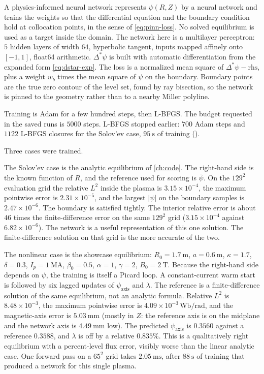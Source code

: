 \documentclass[11pt,a4paper,oneside,openany]{book}
\newcommand{\code}{\path}
\numberwithin{equation}{chapter}
\newcommand{\Dstar}{\Delta^{*}}
\newcommand{\psibar}{\bar{\psi}}
\newcommand{\Ip}{I_{p}}
\theoremstyle{definition}
\begin{document}
A physics-informed neural network represents \(\psi(R,Z)\) by a neural network and trains the weights so that the differential equation and the boundary condition hold at collocation points, in the sense of \eqref{eq:pinn-loss}. No solved equilibrium is used as a target inside the domain. The network here is a multilayer perceptron: \(5\) hidden layers of width \(64\), hyperbolic tangent, inputs mapped affinely onto \([-1,1]\), float64 arithmetic. \(\Dstar\psi\) is built with automatic differentiation from the expanded form \eqref{eq:dstar-exp}. The loss is a normalized mean square of \(\Dstar\psi-\mathrm{rhs}\), plus a weight \(w_{b}\) times the mean square of \(\psi\) on the boundary. Boundary points are the true zero contour of the level set, found by ray bisection, so the network is pinned to the geometry rather than to a nearby Miller polyline.

Training is Adam for a few hundred steps, then L-BFGS. The budget requested in the saved runs is \(5000\) steps. L-BFGS stopped earlier: \(700\) Adam steps and \(1122\) L-BFGS closures for the Solov'ev case, \(\qty{95}{\second}\) of training (\code{outputs/pinn/solovev_metrics.json}).

Three cases were trained.

The Solov'ev case is the analytic equilibrium of \cref{ch:code}. The right-hand side is the known function of \(R\), and the reference used for scoring is \(\psibar\). On the \(129^{2}\) evaluation grid the relative \(L^{2}\) inside the plasma is \(3.15\times 10^{-4}\), the maximum pointwise error is \(2.31\times 10^{-5}\), and the largest \(\lvert\psi\rvert\) on the boundary samples is \(2.47\times 10^{-6}\). The boundary is satisfied tightly. The interior relative error is about \(46\) times the finite-difference error on the same \(129^{2}\) grid (\(3.15\times 10^{-4}\) against \(6.82\times 10^{-6}\)). The network is a useful representation of this one solution. The finite-difference solution on that grid is the more accurate of the two.

The nonlinear case is the showcase equilibrium: \(R_{0}=\qty{1.7}{\metre}\), \(a=\qty{0.6}{\metre}\), \(\kappa=1.7\), \(\delta=0.3\), \(\Ip=\qty{1}{\mega\ampere}\), \(\beta_{0}=0.5\), \(\alpha=1\), \(\gamma=2\), \(B_{0}=\qty{2}{\tesla}\). Because the right-hand side depends on \(\psi\), the training is itself a Picard loop. A constant-current warm start is followed by six lagged updates of \(\psi_{\mathrm{axis}}\) and \(\lambda\). The reference is a finite-difference solution of the same equilibrium, not an analytic formula. Relative \(L^{2}\) is \(8.48\times 10^{-3}\), the maximum pointwise error is \(4.09\times 10^{-3}\,\mathrm{Wb/rad}\), and the magnetic-axis error is \(\qty{5.03}{\milli\metre}\) (mostly in \(Z\): the reference axis is on the midplane and the network axis is \(\qty{4.49}{\milli\metre}\) low). The predicted \(\psi_{\mathrm{axis}}\) is \(0.3560\) against a reference \(0.3588\), and \(\lambda\) is off by a relative \(0.835\%\). This is a qualitatively right equilibrium with a percent-level flux error, visibly worse than the linear analytic case. One forward pass on a \(65^{2}\) grid takes \(\qty{2.05}{\milli\second}\), after \(\qty{88}{\second}\) of training that produced a network for this single plasma.
\end{document}
